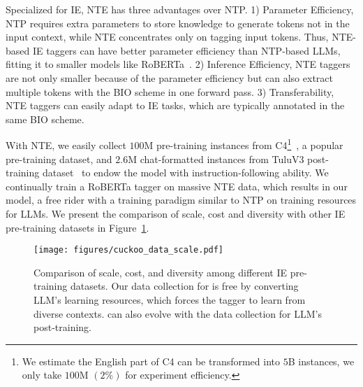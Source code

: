 Specialized for IE, NTE has three advantages over NTP. 1) Parameter Efficiency, NTP requires extra parameters to store knowledge to generate tokens not in the input context, while NTE concentrates only on tagging input tokens. 
Thus, NTE-based IE taggers can have better parameter efficiency than NTP-based LLMs, fitting it to smaller models like RoBERTa~\citep{roberta}. 2) Inference Efficiency, NTE taggers are not only smaller because of the parameter efficiency but can also extract multiple tokens with the BIO scheme in one forward pass. 3) Transferability, NTE taggers can easily adapt to IE tasks, which are typically annotated in the same BIO scheme.

With NTE, we easily collect $100$M pre-training instances from C4\footnote{We estimate the English part of C4 can be transformed into $5$B instances, we only take $100$M $(2\%)$ for experiment efficiency.}~\citep{t5}, a popular pre-training dataset, and $2.6$M chat-formatted instances from TuluV3 post-training dataset~\citep{tulu3} to endow the model with instruction-following ability.
We continually train a RoBERTa tagger on massive NTE data, which results in our \emph{\our} model, a free rider with a training paradigm similar to NTP on training resources for LLMs. We present the comparison of scale, cost and diversity with other IE pre-training datasets in Figure~\ref{fig:cuckoo_data_scale}.

\begin{figure}
    \centering
    \texttt{[image: figures/cuckoo\_data\_scale.pdf]}
    \caption{Comparison of scale, cost, and diversity among different IE pre-training datasets. Our data collection for \our is free by converting LLM's learning resources, which forces the tagger to learn from diverse contexts. \our can also evolve with the data collection for LLM's post-training.}
    \label{fig:cuckoo_data_scale}
    \vspace{-5mm}
\end{figure}

